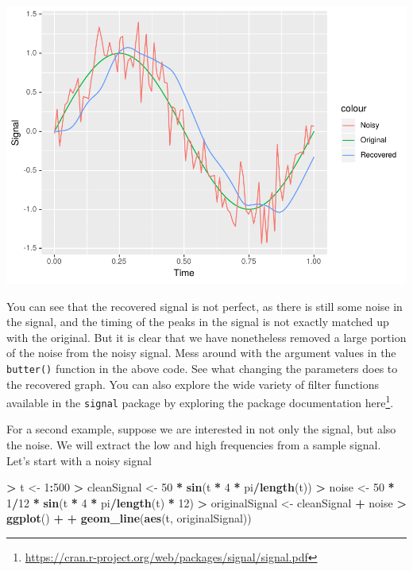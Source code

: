 \documentclass[
]{krantz}
\makeatletter
\newenvironment{Shaded}{\begin{snugshade}}{\end{snugshade}}
\newcommand{\DecValTok}[1]{\textcolor[rgb]{0.06,0.06,0.06}{#1}}
\newcommand{\KeywordTok}[1]{\textcolor[rgb]{0.27,0.27,0.27}{\textbf{#1}}}
\newcommand{\NormalTok}[1]{#1}
\newcommand{\OperatorTok}[1]{\textcolor[rgb]{0.43,0.43,0.43}{\textbf{#1}}}
\newcommand{\StringTok}[1]{\textcolor[rgb]{0.5,0.5,0.5}{#1}}
\renewcommand{\href}[2]{#2\footnote{\url{#1}}}
\newenvironment{kframe}{%
\medskip{}
\setlength{\fboxsep}{.8em}
 \def\at@end@of@kframe{}%
 \ifinner\ifhmode%
  \def\at@end@of@kframe{\end{minipage}}%
  \begin{minipage}{\columnwidth}%
 \fi\fi%
 \def\FrameCommand##1{\hskip\@totalleftmargin \hskip-\fboxsep
 \colorbox{shadecolor}{##1}\hskip-\fboxsep
     \hskip-\linewidth \hskip-\@totalleftmargin \hskip\columnwidth}%
 \MakeFramed {\advance\hsize-\width
   \@totalleftmargin\z@ \linewidth\hsize
   \@setminipage}}%
 {\par\unskip\endMakeFramed%
 \at@end@of@kframe}
\renewenvironment{Shaded}{\begin{kframe}}{\end{kframe}}
\makeatother
\begin{document}
\includegraphics{bookdown_files/figure-latex/unnamed-chunk-327-1.pdf}

You can see that the recovered signal is not perfect, as there is still some noise in the signal, and the timing of the peaks in the signal is not exactly matched up with the original. But it is clear that we have nonetheless removed a large portion of the noise from the noisy signal. Mess around with the argument values in the \texttt{butter()} function in the above code. See what changing the parameters does to the recovered graph. You can also explore the wide variety of filter functions available in the \texttt{signal} package by exploring the package documentation \href{https://cran.r-project.org/web/packages/signal/signal.pdf}{here}.

For a second example, suppose we are interested in not only the signal, but also the noise. We will extract the low and high frequencies from a sample signal. Let's start with a noisy signal

\begin{Shaded}
\begin{Highlighting}[]
\OperatorTok{\textgreater{}}\StringTok{ }\NormalTok{t \textless{}{-}}\StringTok{ }\DecValTok{1}\OperatorTok{:}\DecValTok{500}
\OperatorTok{\textgreater{}}\StringTok{ }\NormalTok{cleanSignal \textless{}{-}}\StringTok{ }\DecValTok{50} \OperatorTok{*}\StringTok{ }\KeywordTok{sin}\NormalTok{(t }\OperatorTok{*}\StringTok{ }\DecValTok{4} \OperatorTok{*}\StringTok{ }\NormalTok{pi}\OperatorTok{/}\KeywordTok{length}\NormalTok{(t))}
\OperatorTok{\textgreater{}}\StringTok{ }\NormalTok{noise \textless{}{-}}\StringTok{ }\DecValTok{50} \OperatorTok{*}\StringTok{ }\DecValTok{1}\OperatorTok{/}\DecValTok{12} \OperatorTok{*}\StringTok{ }\KeywordTok{sin}\NormalTok{(t }\OperatorTok{*}\StringTok{ }\DecValTok{4} \OperatorTok{*}\StringTok{ }\NormalTok{pi}\OperatorTok{/}\KeywordTok{length}\NormalTok{(t) }\OperatorTok{*}\StringTok{ }\DecValTok{12}\NormalTok{)}
\OperatorTok{\textgreater{}}\StringTok{ }\NormalTok{originalSignal \textless{}{-}}\StringTok{ }\NormalTok{cleanSignal }\OperatorTok{+}\StringTok{ }\NormalTok{noise}
\OperatorTok{\textgreater{}}\StringTok{ }\KeywordTok{ggplot}\NormalTok{() }\OperatorTok{+}\StringTok{ }
\OperatorTok{+}\StringTok{   }\KeywordTok{geom\_line}\NormalTok{(}\KeywordTok{aes}\NormalTok{(t, originalSignal))}
\end{Highlighting}
\end{Shaded}
\end{document}

